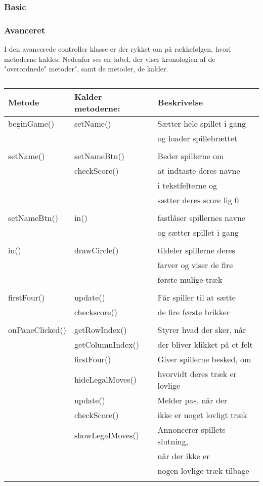 \subsubsection{Basic}



\subsubsection{Avanceret}
I den avancerede controller klasse er der rykket om på rækkefølgen, hvori metoderne kaldes. Nedenfor ses en tabel, der viser kronologien af de "overordnede" metoder", samt de metoder, de kalder.
\begin{table}[H]
\centering
\caption{}\label{tbl:}
\begin{tabular}{lll}
\toprule
Metode & Kalder metoderne: & Beskrivelse \\
\midrule
beginGame() & setName() & Sætter hele spillet i gang\\
&& og loader spillebrættet \\
& \\

setName() & setNameBtn() & Beder spillerne om \\ 
& checkScore() & at indtaste deres navne \\
&& i tekstfelterne og \\
&& sætter deres score lig 0\\
& \\

setNameBtn() & in() & fastlåser spillernes navne \\
&& og sætter spillet i gang\\
& \\

in() & drawCircle() & tildeler spillerne deres \\
&& farver og viser de fire \\
&& første mulige træk \\
& \\

firstFour() & update() & Får spiller til at sætte \\
& checkscore() & de fire første brikker\\
& \\

onPaneClicked() & getRowIndex() & Styrer hvad der sker, når \\ 
& getColumnIndex() & der bliver klikket på et felt\\
&  firstFour() & Giver spillerne besked, om \\
& hideLegalMoves() &hvorvidt deres træk er lovlige\\
& update() & Melder pas, når der \\ 
& checkScore() & ikke er noget lovligt træk\\
& showLegalMoves() & Annoncerer spillets slutning,\\ 
&& når der ikke er \\
&& nogen lovlige træk tilbage\\
& \\


\end{tabular}
\end{table}
